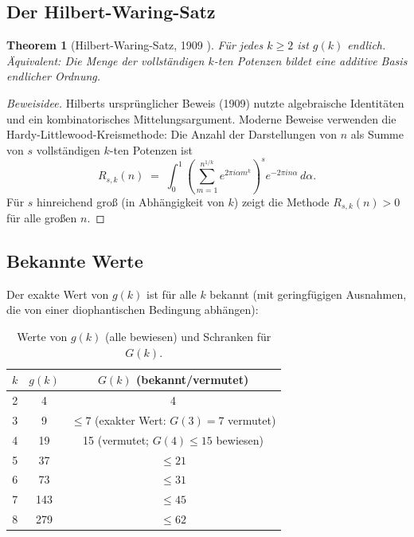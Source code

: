 \documentclass[12pt,a4paper]{amsart}
\newtheorem{theorem}{Theorem}[section]
\theoremstyle{definition}
\begin{document}
\subsection{Der Hilbert-Waring-Satz}

\begin{theorem}[Hilbert-Waring-Satz, 1909 \cite{Hilbert1909}]
\label{thm:hilbert-waring}
F\"{u}r jedes $k \geq 2$ ist $g(k)$ endlich.  \"{A}quivalent:
Die Menge der vollst\"{a}ndigen $k$-ten Potenzen bildet eine additive
Basis endlicher Ordnung.
\end{theorem}

\begin{proof}[Beweis\-idee]
Hilberts urspr\"{u}nglicher Beweis (1909) nutzte algebraische Identit\"{a}ten
und ein kombinatorisches Mittelungsargument.  Moderne Beweise verwenden
die Hardy-Littlewood-Kreismethode: Die Anzahl der Darstellungen von $n$
als Summe von $s$ vollst\"{a}ndigen $k$-ten Potenzen ist
\[
  R_{s,k}(n) \;=\; \int_0^1
  \left(\sum_{m=1}^{n^{1/k}} e^{2\pi i \alpha m^k}\right)^s
  e^{-2\pi i n \alpha}\, d\alpha.
\]
F\"{u}r $s$ hinreichend gro\ss{} (in Abh\"{a}ngigkeit von $k$) zeigt die
Methode $R_{s,k}(n) > 0$ f\"{u}r alle gro\ss{}en $n$.
\end{proof}

\subsection{Bekannte Werte}

Der exakte Wert von $g(k)$ ist f\"{u}r alle $k$ bekannt (mit geringf\"{u}gigen
Ausnahmen, die von einer diophantischen Bedingung abh\"{a}ngen):

\begin{table}[h]
\centering
\begin{tabular}{@{}ccc@{}}
\toprule
$k$ & $g(k)$ & $G(k)$ (bekannt/vermutet) \\
\midrule
2 & 4  & 4 \\
3 & 9  & $\leq 7$ (exakter Wert: $G(3) = 7$ vermutet) \\
4 & 19 & 15 (vermutet; $G(4) \leq 15$ bewiesen) \\
5 & 37 & $\leq 21$ \\
6 & 73 & $\leq 31$ \\
7 & 143 & $\leq 45$ \\
8 & 279 & $\leq 62$ \\
\bottomrule
\end{tabular}
\caption{Werte von $g(k)$ (alle bewiesen) und Schranken f\"{u}r $G(k)$.}
\label{tab:waring}
\end{table}
\end{document}
